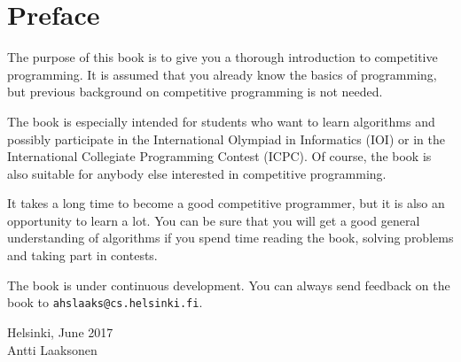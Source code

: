 \chapter*{Preface}

The purpose of this book is to give you
a thorough introduction to competitive programming.
It is assumed that you already
know the basics of programming, but previous
background on competitive programming is not needed.

The book is especially intended for
students who want to learn algorithms and
possibly participate in
the International Olympiad in Informatics (IOI) or
in the International Collegiate Programming Contest (ICPC).
Of course, the book is also suitable for 
anybody else interested in competitive programming.

It takes a long time to become a good competitive
programmer, but it is also an opportunity to learn a lot.
You can be sure that you will get
a good general understanding of algorithms
if you spend time reading the book,
solving problems and taking part in contests.

The book is under continuous development.
You can always send feedback on the book to
\texttt{ahslaaks@cs.helsinki.fi}.

\begin{flushright}
Helsinki, June 2017 \\
Antti Laaksonen
\end{flushright}
